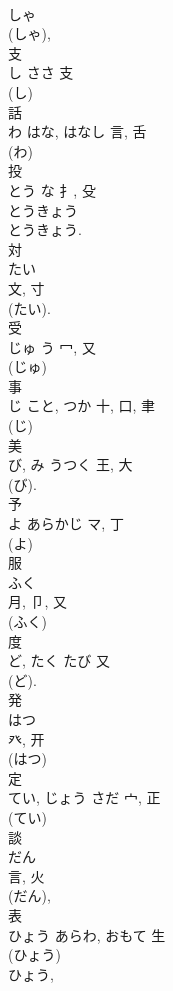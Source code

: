 \documentclass[8pt]{extreport}
\begin{document}
\begin{CJK}{UTF8}{min}
\\	しゃ 
\\	(しゃ), 
\\	支	
\\	し	ささ	支	
\\	(し) 
\\	話	
\\	わ	はな, はなし	言, 舌	
\\	(わ) 
\\	投	
\\	とう	な	扌, 殳	
\\	とうきょう 
\\	とうきょう. 
\\	対	
\\	たい	
\\	文, 寸	
\\	(たい). 
\\	受	
\\	じゅ	う	冖, 又		
\\	(じゅ) 
\\	事	
\\	じ	こと, つか	十, 口, 聿	
\\	(じ) 
\\	美	
\\	び, み	うつく	王, 大		
\\	(び). 
\\	予	
\\	よ	あらかじ	マ, 丁	
\\	(よ) 
\\	服	
\\	ふく	
\\	月, 卩, 又	
\\	(ふく) 
\\	度	
\\	ど, たく	たび	又		
\\	(ど).	
\\	発	
\\	はつ	
\\	癶, 开	
\\	(はつ) 
\\	定	
\\	てい, じょう	さだ	宀, 正	
\\	(てい) 
\\	談	
\\	だん	
\\	言, 火	
\\	(だん), 
\\	表	
\\	ひょう	あらわ, おもて	生		
\\	(ひょう) 
\\	ひょう, 

\end{CJK}
\end{document}
